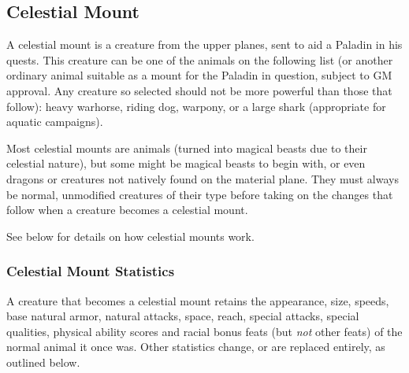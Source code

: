 \subsection{Celestial Mount}
\label{sec:CelestialMount}
A celestial mount is a creature from the upper planes, sent to aid a Paladin in his quests. 
This creature can be one of the animals on the following list 
(or another ordinary animal suitable as a mount for the Paladin in question, subject to GM approval.
Any creature so selected should not be more powerful than those that follow):
heavy warhorse, riding dog, warpony, or a large shark (appropriate for aquatic campaigns).

Most celestial mounts are animals (turned into magical beasts due to their celestial nature), 
but some might be magical beasts to begin with, or even dragons or creatures not natively found on the material plane.
They must always be normal, unmodified creatures of their type before taking on the changes that follow when a creature becomes a celestial mount.

See below for details on how celestial mounts work.
\subsubsection{Celestial Mount Statistics}
A creature that becomes a celestial mount retains the appearance, size, speeds, base natural armor, natural attacks, space, reach, special attacks, special qualities, 
physical ability scores and racial bonus feats (but \emph{not} other feats) of the normal animal it once was.
Other statistics change, or are replaced entirely, as outlined below.

